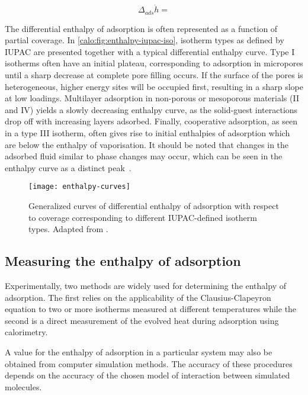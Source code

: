 \begin{equation}
  \Delta_{ads} \dot{h} = 
\end{equation}

The differential enthalpy of adsorption is often represented as a
function of partial coverage. In \autoref{calo:fig:enthalpy-iupac-iso},
isotherm types as defined by IUPAC are presented together with
a typical differential enthalpy curve. Type I isotherms often 
have an initial plateau, corresponding to adsorption in micropores
until a sharp decrease at complete pore filling occurs. If the surface
of the pores is heterogeneous, higher energy sites will be occupied
first, resulting in a sharp slope at low loadings. Multilayer
adsorption in non-porous or mesoporous materials (II and IV) yields
a slowly decreasing enthalpy curve, as the solid-guest interactions
drop off with increasing layers adsorbed. Finally, cooperative adsorption,
as seen in a type III isotherm, often gives rise to initial enthalpies
of adsorption which are below the enthalpy of vaporisation.
It should be noted that changes in the adsorbed fluid similar 
to phase changes may occur, which can be seen in the enthalpy curve
as a distinct peak~\cite{llewellynAdsorptionMFItypeZeolites1993, %
llewellynAdsorptionMFItypeZeolites1993a}.

\begin{figure}[htb]
  \centering

  \texttt{[image: enthalpy-curves]}
  \caption{
    Generalized curves of differential enthalpy of adsorption with 
    respect to coverage corresponding to different 
    IUPAC-defined isotherm types.
    Adapted from \citeauthor{llewellynGasAdsorptionMicrocalorimetry2005}%
    \cite{llewellynGasAdsorptionMicrocalorimetry2005}.
  }%
  \label{calo:fig:enthalpy-iupac-iso}

\end{figure}

\subsection{Measuring the enthalpy of adsorption}

Experimentally, two methods are widely used for determining the 
enthalpy of adsorption. The first relies on the applicability of the 
Clausius-Clapeyron equation to two or more isotherms measured 
at different temperatures while the second is a 
direct measurement of the evolved heat during adsorption 
using calorimetry.

A value for the enthalpy of adsorption in a particular system
may also be obtained from computer simulation methods. 
The accuracy of these procedures depends on the accuracy of
the chosen model of interaction between simulated molecules.

